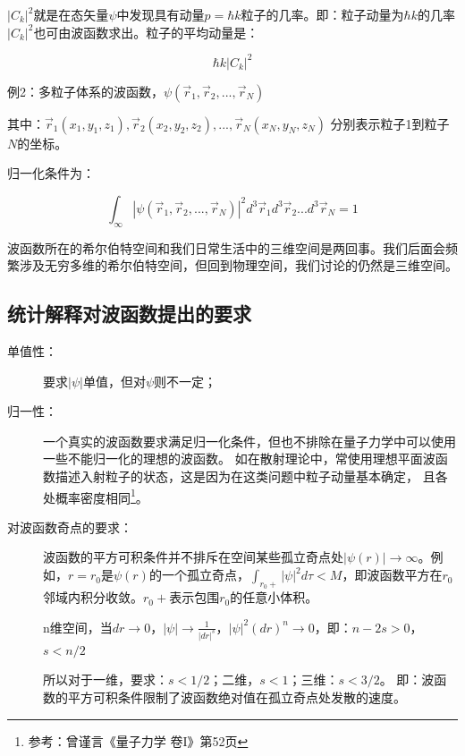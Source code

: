 $\left| {C_k } \right|^2 $就是在态矢量$\psi$中发现具有动量$p = \hbar k$粒子的几率。即：粒子动量为$\hbar k$的几率$\left| C_k \right|^2$也可由波函数求出。粒子的平均动量是：

\begin{equation}
\hbar k \left| C_k \right|^2
\end{equation}

例2：多粒子体系的波函数，$\psi (\vec r_1 ,\vec r_2 ,...,\vec r_N )$

其中：$\vec r_1 (x_1 ,y_1 ,z_1 ),\vec r_2 (x_2 ,y_2 ,z_2 ),...,\vec r_N (x_N ,y_N ,z_N )$
分别表示粒子1到粒子$N$的坐标。

归一化条件为：

\begin{equation}
\int_\infty  {\left| {\psi (\vec r_1 ,\vec r_2 ,...,\vec r_N )} \right|} ^2 d^3 \vec r_1 d^3 \vec r_2 ...d^3 \vec r_N  = 1
\end{equation}

波函数所在的希尔伯特空间和我们日常生活中的三维空间是两回事。我们后面会频繁涉及无穷多维的希尔伯特空间，但回到物理空间，我们讨论的仍然是三维空间。

\subsection{统计解释对波函数提出的要求}


\begin{description}
    \item[单值性：] 要求$\left| \psi  \right|$单值，但对$\psi$则不一定；
    \item[归一性：] 一个真实的波函数要求满足归一化条件，但也不排除在量子力学中可以使用一些不能归一化的理想的波函数。
如在散射理论中，常使用理想平面波函数描述入射粒子的状态，这是因为在这类问题中粒子动量基本确定，
且各处概率密度相同\footnote{参考：曾谨言《量子力学 卷I》第52页}。
    \item[对波函数奇点的要求：] 波函数的平方可积条件并不排斥在空间某些孤立奇点处$\left| {\psi (r)} \right| \to \infty $。例如，$r = r_0 $是$\psi (r)$的一个孤立奇点，$\int_{r_0  + } {\left| \psi  \right|^2 d\tau }  < M$，即波函数平方在$r_0$邻域内积分收敛。$r_0  + $表示包围$r_0$的任意小体积。


n维空间，当$dr \to 0$，$\left| \psi  \right| \to \frac{1}{{\left|
{dr} \right|^s }}$，$\left| \psi  \right|^2 (dr)^n  \to 0$，即：$n -
2s > 0$，$s < n/2$

所以对于一维，要求：$s < 1/2$；二维，$s < 1$；三维：$s < 3/2$。
即：波函数的平方可积条件限制了波函数绝对值在孤立奇点处发散的速度。

\end{description}


